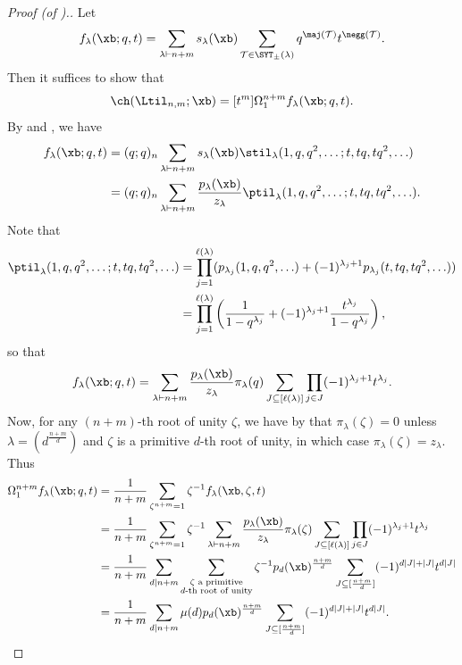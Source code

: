 \begin{proof}[Proof (of ).]
    Let 
    \[
    f_\lambda(\xb;q,t) = \sum_{\lambda \vdash n+m} s_\lambda(\xb) \sum_{\mathcal{T} \in \SYT_\pm(\lambda)} q^{\maj(\mathcal{T})}t^{\negg(\mathcal{T})}.
    \]
    Then it suffices to show that
    \[
    \ch(\Ltil_{n,m};\xb) = [t^m]\Omega_1^{n+m}f_\lambda(\xb;q,t).
    \]
    By  and , we have
    \begin{align*}
    f_\lambda(\xb;q,t) &= (q;q)_n \sum_{\lambda \vdash n+m} s_\lambda(\xb) \stil_\lambda(1,q,q^2,\ldots;t,tq,tq^2,\ldots) \\
    &= (q;q)_n \sum_{\lambda \vdash n+m} \frac{p_\lambda(\xb)}{z_\lambda} \ptil_\lambda(1,q,q^2,\ldots;t,tq,tq^2,\ldots).
    \end{align*}
    Note that
    \begin{align*}
    \ptil_\lambda(1,q,q^2,\ldots;t,tq,tq^2,\ldots) &= \prod_{j=1}^{\ell(\lambda)} (p_{\lambda_j}(1,q,q^2,\ldots) + (-1)^{\lambda_j+1}p_{\lambda_j}(t,tq,tq^2,\ldots)) \\
    &= \prod_{j=1}^{\ell(\lambda)} \left( \frac{1}{1-q^{\lambda_j}} + (-1)^{\lambda_j+1}\frac{t^{\lambda_j}}{1-q^{\lambda_j}} \right),
    \end{align*}
    so that
    \[
    f_\lambda(\xb;q,t) = \sum_{\lambda \vdash n+m} \frac{p_\lambda(\xb)}{z_\lambda} \pi_\lambda(q) \sum_{J \subseteq [\ell(\lambda)]} \prod_{j \in J} (-1)^{\lambda_j+1}t^{\lambda_j}.
    \]
    Now, for any $(n+m)$-th root of unity $\zeta$, we have by  that $\pi_\lambda(\zeta) = 0$ unless $\lambda = (d^\frac{n+m}{d})$ and $\zeta$ is a primitive $d$-th root of unity, in which case $\pi_\lambda(\zeta) = z_\lambda$. Thus
    \begin{align*}
    \Omega_1^{n+m}f_\lambda(\xb;q,t) &= \frac{1}{n+m} \sum_{\zeta^{n+m} = 1} \zeta^{-1} f_\lambda(\xb,\zeta,t) \\
    &= \frac{1}{n+m} \sum_{\zeta^{n+m} = 1} \zeta^{-1} \sum_{\lambda \vdash n+m} \frac{p_\lambda(\xb)}{z_\lambda} \pi_\lambda(\zeta) \sum_{J \subseteq [\ell(\lambda)]} \prod_{j \in J} (-1)^{\lambda_j+1}t^{\lambda_j} \\
    &= \frac{1}{n+m} \sum_{d \mid n+m} \sum_{\substack{\zeta \text{ a primitive} \\ \text{$d$-th root of unity}}} \zeta^{-1} p_d(\xb)^\frac{n+m}{d} \sum_{J \subseteq [\frac{n+m}{d}]} (-1)^{d|J| + |J|}t^{d|J|} \\
    &= \frac{1}{n+m} \sum_{d \mid n+m} \mu(d) p_d(\xb)^\frac{n+m}{d} \sum_{J \subseteq [\frac{n+m}{d}]} (-1)^{d|J| + |J|}t^{d|J|}.

\end{align*}
\end{proof}
